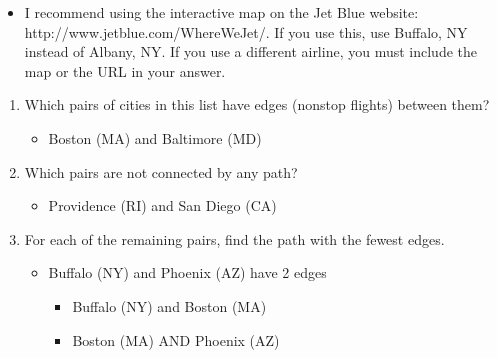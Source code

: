\documentclass[10pt]{article}
\begin{document}
\begin{enumerate}
		\begin{itemize}
			\item I recommend using the interactive map on the Jet Blue website: http://www.jetblue.com/WhereWeJet/. If you use this, use Buffalo, NY instead of Albany, NY. If you use a different airline, you must include the map or the URL in your answer.
		\end{itemize}
		
		\begin{enumerate}
			\item Which pairs of cities in this list have edges (nonstop flights) between them?
				\begin{itemize}
					\item Boston (MA) and Baltimore (MD)
				\end{itemize}
			\item Which pairs are not connected by any path?
				\begin{itemize}
					\item Providence (RI) and San Diego (CA)
				\end{itemize}
			
			\item For each of the remaining pairs, find the path with the fewest edges.
				\begin{itemize}
					\item Buffalo (NY) and Phoenix (AZ) have 2 edges
						\begin{itemize}
							\item Buffalo (NY) and Boston (MA)
							\item Boston (MA) AND Phoenix (AZ)
						\end{itemize}
						

\end{itemize}
\end{enumerate}
\end{enumerate}
\end{document}
